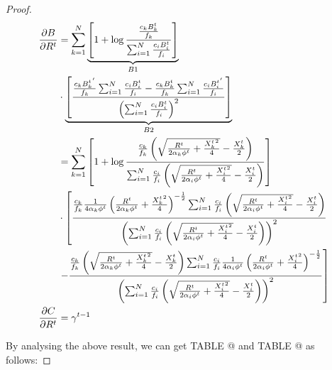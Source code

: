 \documentclass[conference]{IEEEtran}
\makeatletter
\newcommand{\Rmnum}[1]{\expandafter\@slowromancap\romannumeral #1@}
\newtheorem{proof}{Proof}
\makeatother
\begin{document}
\begin{proof}
\begin{alignat}{2}
        \frac{\partial{B}}{\partial{R^t}}
        & = \sum_{k=1}^{N}\underbrace{\left[1 + \log\frac{\frac{c_kB_k^t}{f_k}}{\sum_{i=1}^{N}\frac{c_iB_i^t}{f_i}}\right]}_{B1} \nonumber \\
        & \cdot \underbrace{\left[\frac{\frac{c_k{B_k^t}^{'}}{f_k}\sum_{i=1}^{N}\frac{c_iB_i^t}{f_i} - \frac{c_kB_k^t}{f_k}\sum_{i=1}^{N}\frac{c_i{B_i^t}^{'}}{f_i}}{{\left(\sum_{i=1}^{N}\frac{c_iB_i^t}{f_i}\right)}^2}\right]}_{B2} \nonumber \\
        & = \sum_{k=1}^{N}\left[1 + \log\frac{\frac{c_k}{f_k}\left(\sqrt{{R^t \over 2\alpha_k\phi^t} + {{X_k^t}^2 \over 4}} - {X_k^t \over 2}\right)}{\sum_{i=1}^{N}\frac{c_i}{f_i}\left(\sqrt{{R^t \over 2\alpha_i\phi^t} + {{X_i^t}^2 \over 4}} - {X_i^t \over 2}\right)}\right] \nonumber \\
        & \cdot \left[\frac{\frac{c_k}{f_k}{1 \over 4\alpha_k\phi^t}\left({R^t \over 2\alpha_k\phi^t} + {{X_k^t}^2 \over 4}\right)^{-\frac{1}{2}}\sum_{i=1}^{N}\frac{c_i}{f_i}\left(\sqrt{{R^t \over 2\alpha_i\phi^t} + {{X_i^t}^2 \over 4}} - {X_i^t \over 2}\right)}{{\left(\sum_{i=1}^{N}\frac{c_i}{f_i}\left(\sqrt{{R^t \over 2\alpha_i\phi^t} + {{X_i^t}^2 \over 4}} - {X_i^t \over 2}\right)\right)}^2} \right.  \nonumber \\
        & \left. - \frac{\frac{c_k}{f_k}\left(\sqrt{{R^t \over 2\alpha_k\phi^t} + {{X_k^t}^2 \over 4}} - {X_k^t \over 2}\right)\sum_{i=1}^{N}\frac{c_i}{f_i}{1 \over 4\alpha_i\phi^t}\left({R^t \over 2\alpha_i\phi^t} + {{X_i^t}^2 \over 4}\right)^{-\frac{1}{2}}}{{\left(\sum_{i=1}^{N}\frac{c_i}{f_i}\left(\sqrt{{R^t \over 2\alpha_i\phi^t} + {{X_i^t}^2 \over 4}} - {X_i^t \over 2}\right)\right)}^2}\right] \\

        \frac{\partial{C}}{\partial{R^t}}
        & = \gamma^{t-1}
    \end{alignat}

    By analysing the above result, we can get TABLE \Rmnum{1} and TABLE \Rmnum{2} as follows:


\end{proof}
\end{document}
